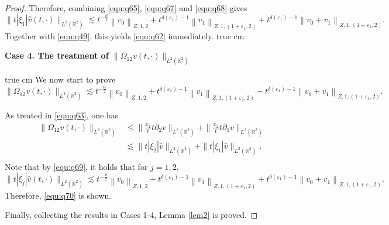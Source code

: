 \documentclass[11pt,twoside]{article}
\newcommand{\R}{\mathbb R}
\newcommand{\p}{\partial}
\newcommand{\f}{\frac}
\theoremstyle{plain}
\theoremstyle{definition}
\theoremstyle{remark}
\numberwithin{equation}{section}
\begin{document}
\begin{proof}
Therefore, combining \eqref{equ:q65}, \eqref{equ:q67} and \eqref{equ:q68} gives
\begin{equation}\label{equ:q69}
\|t|\xi_1|\hat{v}(t, \cdot)\|_{L^2(\R^2)} \lesssim t^{-\f{\mu}{2}}\left\|v_0\right\|_{Z, 1, 2}
+t^{\delta(\varepsilon_1)-1}\left\|v_1\right\|_{Z, 1,(1+\varepsilon_1, 2)}
+t^{\delta(\varepsilon_1)-1}\left\|v_0+v_1\right\|_{Z, 1,(1+\varepsilon_1, 2)}.
\end{equation}
Together with \eqref{equ:q49}, this yields \eqref{equ:q62} immediately.
 true cm

{\bf Case 4.  The treatment of $\|\Omega_{12}v(t, \cdot)\|_{L^2(\R^2)}$ }

 true cm
We now start to prove
\begin{equation}\label{equ:q70}
\|\Omega_{12}v(t, \cdot)\|_{L^2(\R^2)} \lesssim t^{-\f{\mu}{2}}\left\|v_0\right\|_{Z, 1, 2}+t^{\delta(\varepsilon_1)-1}\left\|v_1\right\|_{Z, 1,(1+\varepsilon_1, 2)}+t^{\delta(\varepsilon_1)-1}\left\|v_0+v_1\right\|_{Z, 1,(1+\varepsilon_1, 2)}.
\end{equation}

As treated in \eqref{equ:q63}, one has
\begin{equation}\label{equ:q71}
\begin{aligned}
\|\Omega_{12}v(t, \cdot)\|_{L^2(\R^2)}&\leq \|\f{x_1}{t}t\p_2v\|_{L^2(\R^2)}+\|\f{x_2}{t}t\p_1v\|_{L^2(\R^2)}\\
& \lesssim \|t|\xi_2|\hat{v}\|_{L^2(\R^2)}+\|t|\xi_1|\hat{v}\|_{L^2(\R^2)}.\\
\end{aligned}
\end{equation}
Note that by \eqref{equ:q69}, it holds that for $j=1,2$,
$$
\|t|\xi_j|\hat{v}(t, \cdot)\|_{L^2(\R^2)} \lesssim t^{-\f{\mu}{2}}\left\|v_0\right\|_{Z, 1, 2}
+t^{\delta(\varepsilon_1)-1}\left\|v_1\right\|_{Z, 1,(1+\varepsilon_1, 2)}
+t^{\delta(\varepsilon_1)-1}\left\|v_0+v_1\right\|_{Z, 1,(1+\varepsilon_1, 2)}.
$$
Therefore, \eqref{equ:q70} is shown.

Finally, collecting the results in Cases 1-4, Lemma \ref{lem2} is proved.
\end{proof}
\end{document}
